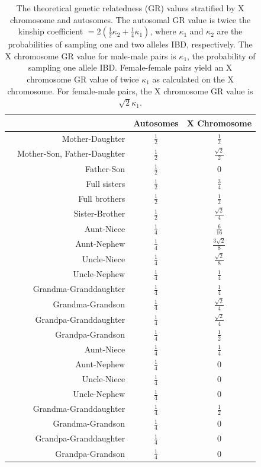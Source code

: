 \documentclass[11pt]{article} %
\begin{document}
\bgroup
\def\arraystretch{1.5}
\begin{table}[ht]
\centering
\begin{tabular}{crcc}
  \hline
&& Autosomes & X Chromosome\\
  \hline
&Mother-Daughter &$\frac{1}{2}$ & $\frac{1}{2}$\\
&Mother-Son, Father-Daughter &$\frac{1}{2}$& $\frac{\sqrt{2}}{2}$\\
&Father-Son &$\frac{1}{2}$&0\\
&Full sisters & $\frac{1}{2}$ & $\frac{3}{4}$\\
&Full brothers &$\frac{1}{2}$&$\frac{1}{2}$\\
&Sister-Brother &$\frac{1}{2}$&$\frac{\sqrt{2}}{4}$\\
\hline
\parbox[t]{2mm}{} & Aunt-Niece &$\frac{1}{4}$&$\frac{6}{16}$\\
&Aunt-Nephew&$\frac{1}{4}$&$\frac{3\sqrt{2}}{8}$\\
&Uncle-Niece &$\frac{1}{4}$&$\frac{\sqrt{2}}{8}$\\
&Uncle-Nephew &$\frac{1}{4}$&$\frac{1}{4}$\\
&Grandma-Granddaughter &$\frac{1}{4}$&$\frac{1}{4}$\\
&Grandma-Grandson &$\frac{1}{4}$&$\frac{\sqrt{2}}{4}$\\
&Grandpa-Granddaughter&$\frac{1}{4}$&$\frac{\sqrt{2}}{4}$\\
&Grandpa-Grandson &$\frac{1}{4}$&$\frac{1}{2}$\\
\hline
\parbox[t]{2mm}{} &Aunt-Niece &$\frac{1}{4}$&$\frac{1}{4}$\\
&Aunt-Nephew&$\frac{1}{4}$&0\\
&Uncle-Niece &$\frac{1}{4}$&0\\
&Uncle-Nephew &$\frac{1}{4}$&0\\
&Grandma-Granddaughter &$\frac{1}{4}$&$\frac{1}{2}$\\
&Grandma-Grandson &$\frac{1}{4}$&0\\
&Grandpa-Granddaughter&$\frac{1}{4}$&0\\
&Grandpa-Grandson &$\frac{1}{4}$&0\\
   \hline
\end{tabular}
\caption{The theoretical genetic relatedness (GR) values stratified by X chromosome and autosomes. The autosomal GR value is twice the kinship coefficient $= 2(\frac{1}{2}\kappa_2+\frac{1}{4}\kappa_1)$, where $\kappa_1$ and $\kappa_2$ are the probabilities of sampling one and two alleles IBD, respectively. The X chromosome GR value for male-male pairs is $\kappa_1$, the probability of sampling one allele IBD. Female-female pairs yield an X chromosome GR value of twice $\kappa_1$ as calculated on the X chromosome. For female-male pairs, the X chromosome GR value is $\sqrt{2}\kappa_1$.}
\end{table}
\end{document}
